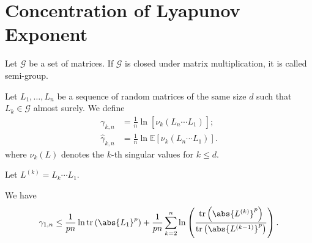 \section{Concentration of Lyapunov Exponent}


\begin{defn}
    Let \( \mathcal{G} \) be a set of matrices. If \( \mathcal{G} \) is closed under matrix multiplication, it is called semi-group. 
  \end{defn}

\begin{defn}[]
    Let \( L_1, \dots, L_n \) be a sequence of random matrices of the same size \( d \) such that \( L_k \in \mathcal{G} \) almost surely. We define 
    \begin{align*}
      \gamma_{k,n} &= \frac{1}{n} \operatorname{ln}\left[\nu_k \left(L_n \cdots L_1\right)_{}\right]; \\
      \widehat{\gamma}_{k,n} &= \frac{1}{n} \operatorname{ln} \mathbb{E}\left[ \nu_k \left(L_n \cdots L_1\right)\right].
    \end{align*}
     where \( \nu_k\left(L\right) \) denotes the \( k \)-th singular values for \( k \leq d \).
\end{defn}


Let \( L^{(k)} = L_k \cdots L_1 \).

\begin{lem}
    We have 
    \[ \gamma_{1,n}  \leq \frac{1}{pn} \operatorname{ln} \operatorname{tr}\left(\abs{L_1}^{p}\right) + \frac{1}{pn}\sum_{k=2}^{n} \operatorname{ln} \left(\frac{\operatorname{tr}\left(\abs{L^{(k)}}^{p}\right)}{\operatorname{tr}\left( \abs{L^{(k-1)}}^{p}\right)}\right).
 \]
\end{lem}

